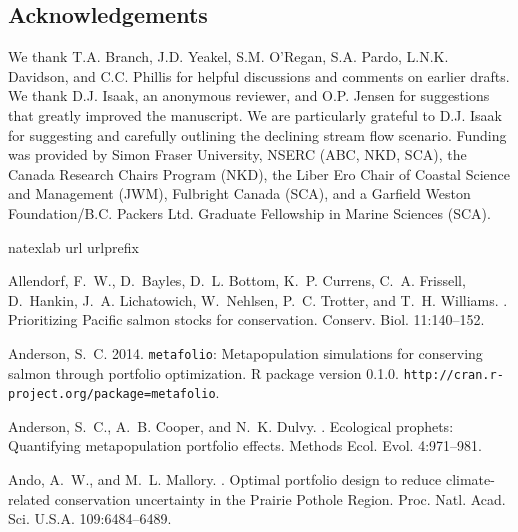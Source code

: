 \documentclass[12pt,english]{article}
\begin{document}
\begin{spacing}{1.9}
\section{Acknowledgements}\label{acknowledgements}

We thank T.A. Branch, J.D. Yeakel, S.M. O'Regan, S.A. Pardo, L.N.K. Davidson, and C.C. Phillis for helpful discussions and comments on earlier drafts. We thank D.J. Isaak, an anonymous reviewer, and O.P. Jensen for suggestions that greatly improved the manuscript. We are particularly grateful to D.J. Isaak for suggesting and carefully outlining the declining stream flow scenario. Funding was provided by Simon Fraser University, NSERC (ABC, NKD, SCA), the Canada Research Chairs Program (NKD), the Liber Ero Chair of Coastal Science and Management (JWM), Fulbright Canada (SCA), and a Garfield Weston Foundation/B.C. Packers Ltd. Graduate Fellowship in Marine Sciences (SCA).

%
%
%
\begin{thebibliography}{64}
\expandafter\ifx\csname natexlab\endcsname\relax\def\natexlab#1{#1}\fi
\expandafter\ifx\csname url\endcsname\relax
  \def\url#1{{\tt #1}}\fi
\expandafter\ifx\csname urlprefix\endcsname\relax\def\urlprefix{URL }\fi

Allendorf, F.~W., D.~Bayles, D.~L. Bottom, K.~P. Currens, C.~A. Frissell,
  D.~Hankin, J.~A. Lichatowich, W.~Nehlsen, P.~C. Trotter, and T.~H. Williams.
.
\newblock Prioritizing {Pacific} salmon stocks for conservation.
\newblock Conserv. Biol. 11:140--152.

Anderson, S.~C. 2014.
\newblock \texttt{metafolio}: Metapopulation simulations for conserving salmon through
  portfolio optimization. \textsf{R} package version 0.1.0.
  \texttt{http://cran.r-project.org/package=metafolio}.

Anderson, S.~C., A.~B. Cooper, and N.~K. Dulvy.
.
\newblock Ecological prophets: Quantifying metapopulation portfolio effects.
\newblock Methods Ecol. Evol. 4:971--981.

Ando, A.~W., and M.~L. Mallory.
.
\newblock Optimal portfolio design to reduce climate-related conservation
  uncertainty in the {Prairie Pothole Region}.
\newblock Proc. Natl. Acad. Sci. U.S.A. 109:6484--6489.


\end{thebibliography}
\end{spacing}
\end{document}
